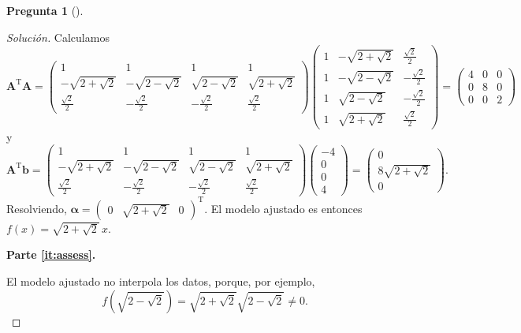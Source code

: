 \documentclass[letter,12pt]{article}
\theoremstyle{definition}
\newtheorem{question}{Pregunta}
\numberwithin{equation}{question}
\newenvironment{solution}{\begin{proof}[Solución]}{\end{proof}}
\begin{document}
\begin{question}[]
\begin{solution}
Calculamos
%
\begin{equation*}
\boldsymbol{A}^{\mathrm{T}} \boldsymbol{A} =
\begin{pmatrix}
1 & 1 & 1 & 1\\
-\sqrt{2+\sqrt{2}} & -\sqrt{2-\sqrt{2}} & \sqrt{2-\sqrt{2}} & \sqrt{2+\sqrt{2}}\\
\frac{\sqrt{2}}{2} & -\frac{\sqrt{2}}{2} & -\frac{\sqrt{2}}{2} & \frac{\sqrt{2}}{2}
\end{pmatrix}
\begin{pmatrix}
1 & -\sqrt{2+\sqrt{2}} & \frac{\sqrt{2}}{2}\\
1 & -\sqrt{2-\sqrt{2}} & -\frac{\sqrt{2}}{2}\\
1 & \sqrt{2-\sqrt{2}} & -\frac{\sqrt{2}}{2}\\
1 & \sqrt{2+\sqrt{2}} & \frac{\sqrt{2}}{2}
\end{pmatrix}
= \begin{pmatrix}
4 & 0 & 0\\
0 & 8 & 0\\
0 & 0 & 2
\end{pmatrix}
\end{equation*}
%
y
\begin{equation*}
\boldsymbol{A}^{\mathrm{T}} \boldsymbol{b}
= \begin{pmatrix}
1 & 1 & 1 & 1\\
-\sqrt{2+\sqrt{2}} & -\sqrt{2-\sqrt{2}} & \sqrt{2-\sqrt{2}} & \sqrt{2+\sqrt{2}}\\
\frac{\sqrt{2}}{2} & -\frac{\sqrt{2}}{2} & -\frac{\sqrt{2}}{2} & \frac{\sqrt{2}}{2}
\end{pmatrix}
\begin{pmatrix} -4 \\ 0 \\ 0 \\ 4 \end{pmatrix}
= \begin{pmatrix} 0 \\ 8\sqrt{2+\sqrt{2}} \\ 0\end{pmatrix}.
\end{equation*}
%
 Resolviendo, $\boldsymbol{\alpha} = \begin{pmatrix} 0 & \sqrt{2+\sqrt{2}} & 0 \end{pmatrix}^{\mathrm{T}}$.
El modelo ajustado es entonces $f(x) = \sqrt{2+\sqrt{2}} \, x$.

\medskip

\textbf{Parte \ref{it:assess}.}

 El modelo ajustado no interpola los datos, porque, por ejemplo,
%
\begin{equation*}
f\left(\sqrt{2-\sqrt{2}}\right) = \sqrt{2+\sqrt{2}} \sqrt{2-\sqrt{2}} \neq 0.
\end{equation*}
%
\end{solution}
\end{question}
\end{document}
